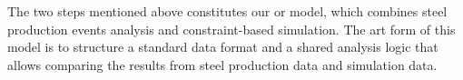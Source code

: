 The two steps mentioned above constitutes our \ac{or} model, which combines steel production events analysis and constraint-based simulation. The art form of this model is to structure a standard data format and a shared analysis logic that allows comparing the results from steel production data and simulation data.